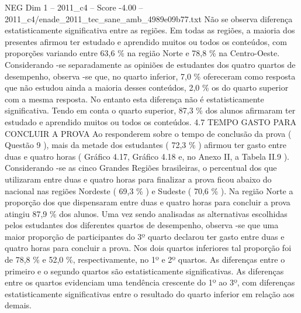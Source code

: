 \begin{textsample}{NEG Dim 1 – 2011\_c4 – Score -4.00 – 2011\_c4/enade\_2011\_tec\_sane\_amb\_4989e09b77.txt}
Não se observa diferença estatisticamente significativa entre as regiões.
Em todas as regiões, a maioria dos presentes afirmou ter estudado e aprendido muitos ou todos os conteúdos, com proporções variando entre 63,6 \% na região Norte e 78,8 \% na Centro-Oeste.
Considerando -se separadamente as opiniões de estudantes dos quatro quartos de desempenho, observa -se que, no quarto inferior, 7,0 \% ofereceram como resposta que não estudou ainda a maioria desses conteúdos, 2,0 \% os do quarto superior com a mesma resposta.
No entanto esta diferença não é estatisticamente significativa.
Tendo em conta o quarto superior, 87,3 \% dos alunos afirmaram ter estudado e aprendido muitos ou todos os conteúdos. 4.7 TEMPO GASTO PARA CONCLUIR A PROVA Ao responderem sobre o tempo de conclusão da prova ( Questão 9 ), mais da metade dos estudantes ( 72,3 \% ) afirmou ter gasto entre duas e quatro horas ( Gráfico 4.17, Gráfico 4.18 e, no Anexo II, a Tabela II.9 ).
Considerando -se as cinco Grandes Regiões brasileiras, o percentual dos que utilizaram entre duas e quatro horas para finalizar a prova ficou abaixo do nacional nas regiões Nordeste ( 69,3 \% ) e Sudeste ( 70,6 \% ).
Na região Norte a proporção dos que dispensaram entre duas e quatro horas para concluir a prova atingiu 87,9 \% dos alunos.
Uma vez sendo analisadas as alternativas escolhidas pelos estudantes dos diferentes quartos de desempenho, observa -se que uma maior proporção de participantes do 3º quarto declarou ter gasto entre duas e quatro horas para concluir a prova.
Nos dois quartos inferiores tal proporção foi de 78,8 \% e 52,0 \%, respectivamente, no 1º e 2º quartos.
As diferenças entre o primeiro e o segundo quartos são estatisticamente significativas.
As diferenças entre os quartos evidenciam uma tendência crescente do 1º ao 3º, com diferenças estatisticamente significativas entre o resultado do quarto inferior em relação aos demais.

\end{textsample}
